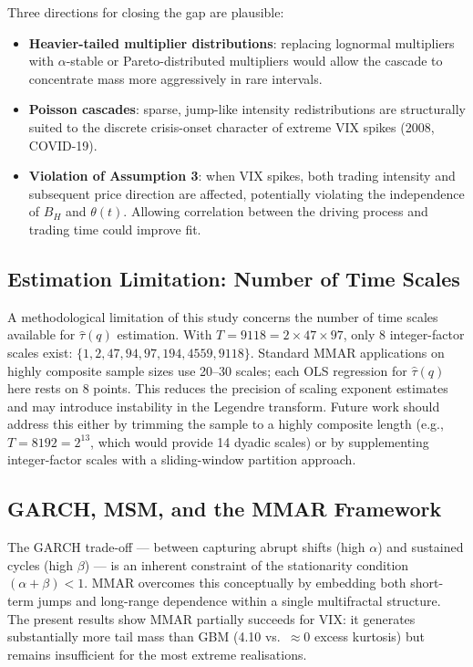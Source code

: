 \documentclass[12pt,a4paper]{article}
\begin{document}
Three directions for closing the gap are plausible:
\begin{itemize}
  \item \textbf{Heavier-tailed multiplier distributions}: replacing
    lognormal multipliers with $\alpha$-stable or Pareto-distributed
    multipliers would allow the cascade to concentrate mass more
    aggressively in rare intervals.
  \item \textbf{Poisson cascades}: sparse, jump-like intensity
    redistributions are structurally suited to the discrete
    crisis-onset character of extreme VIX spikes (2008, COVID-19).
  \item \textbf{Violation of Assumption 3}: when VIX spikes, both
    trading intensity and subsequent price direction are affected,
    potentially violating the independence of $B_H$ and $\theta(t)$.
    Allowing correlation between the driving process and trading time
    could improve fit.
\end{itemize}

\subsection{Estimation Limitation: Number of Time Scales}

A methodological limitation of this study concerns the number of time
scales available for $\hat{\tau}(q)$ estimation. With $T = 9118 =
2 \times 47 \times 97$, only 8 integer-factor scales exist:
$\{1, 2, 47, 94, 97, 194, 4559, 9118\}$. Standard MMAR applications
on highly composite sample sizes use 20--30 scales; each OLS regression
for $\hat{\tau}(q)$ here rests on 8 points. This reduces the precision
of scaling exponent estimates and may introduce instability in the
Legendre transform. Future work should address this either by trimming
the sample to a highly composite length (e.g., $T = 8192 = 2^{13}$,
which would provide 14 dyadic scales) or by supplementing integer-factor
scales with a sliding-window partition approach.

\subsection{GARCH, MSM, and the MMAR Framework}

The GARCH trade-off --- between capturing abrupt shifts (high $\alpha$)
and sustained cycles (high $\beta$) --- is an inherent constraint of
the stationarity condition $(\alpha + \beta) < 1$. MMAR overcomes this
conceptually by embedding both short-term jumps and long-range
dependence within a single multifractal structure. The present results
show MMAR partially succeeds for VIX: it generates substantially more
tail mass than GBM (4.10 vs.\ $\approx 0$ excess kurtosis) but
remains insufficient for the most extreme realisations.
\end{document}
